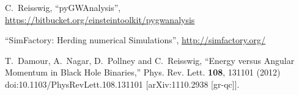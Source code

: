 \begin{thebibliography}{9}
C.~Reisswig,
``pyGWAnalysis'',
\url{https://bitbucket.org/einsteintoolkit/pygwanalysis}

``SimFactory: Herding numerical Simulations'',
\url{http://simfactory.org/}

T.~Damour, A.~Nagar, D.~Pollney and C.~Reisswig,
``Energy versus Angular Momentum in Black Hole Binaries,''
Phys. Rev. Lett. \textbf{108}, 131101 (2012)
doi:10.1103/PhysRevLett.108.131101
[arXiv:1110.2938 [gr-qc]].

\end{thebibliography}



